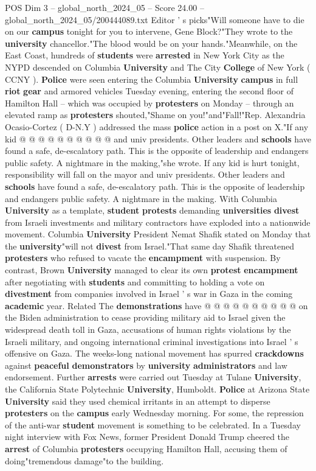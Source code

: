 \begin{textsample}{POS Dim 3 – global\_north\_2024\_05 – Score 24.00 – global\_north\_2024\_05/200444089.txt}
Editor ' s picks"Will someone have to die on our \textbf{campus} tonight for you to intervene, Gene Block?"They wrote to the \textbf{university} chancellor."The blood would be on your hands."Meanwhile, on the East Coast, hundreds of \textbf{students} were \textbf{arrested} in New York City as the NYPD descended on Columbia \textbf{University} and The City \textbf{College} of New York ( CCNY ). \textbf{Police} were seen entering the Columbia \textbf{University} \textbf{campus} in full \textbf{riot} \textbf{gear} and armored vehicles Tuesday evening, entering the second floor of Hamilton Hall -- which was occupied by \textbf{protesters} on Monday -- through an elevated ramp as \textbf{protesters} shouted,"Shame on you!"and"Fall!"Rep.
Alexandria Ocasio-Cortez ( D-N.Y ) addressed the mass \textbf{police} action in a post on X."If any kid @ @ @ @ @ @ @ @ @ @ and univ presidents.
Other leaders and \textbf{schools} have found a safe, de-escalatory path.
This is the opposite of leadership and endangers public safety.
A nightmare in the making,"she wrote.
If any kid is hurt tonight, responsibility will fall on the mayor and univ presidents.
Other leaders and \textbf{schools} have found a safe, de-escalatory path.
This is the opposite of leadership and endangers public safety.
A nightmare in the making.
With Columbia \textbf{University} as a template, \textbf{student} \textbf{protests} demanding \textbf{universities} \textbf{divest} from Israeli investments and military contractors have exploded into a nationwide movement.
Columbia \textbf{University} President Nemat Shafik stated on Monday that the \textbf{university}"will not \textbf{divest} from Israel."That same day Shafik threatened \textbf{protesters} who refused to vacate the \textbf{encampment} with suspension.
By contrast, Brown \textbf{University} managed to clear its own \textbf{protest} \textbf{encampment} after negotiating with \textbf{students} and committing to holding a vote on \textbf{divestment} from companies involved in Israel ' s war in Gaza in the coming \textbf{academic} year.
Related The \textbf{demonstrations} have @ @ @ @ @ @ @ @ @ @ on the Biden administration to cease providing military aid to Israel given the widespread death toll in Gaza, accusations of human rights violations by the Israeli military, and ongoing international criminal investigations into Israel ' s offensive on Gaza.
The weeks-long national movement has spurred \textbf{crackdowns} against \textbf{peaceful} \textbf{demonstrators} by \textbf{university} \textbf{administrators} and law endorsement.
Further \textbf{arrests} were carried out Tuesday at Tulane \textbf{University}, the California State Polytechnic \textbf{University}, Humboldt. \textbf{Police} at Arizona State \textbf{University} said they used chemical irritants in an attempt to disperse \textbf{protesters} on the \textbf{campus} early Wednesday morning.
For some, the repression of the anti-war \textbf{student} movement is something to be celebrated.
In a Tuesday night interview with Fox News, former President Donald Trump cheered the \textbf{arrest} of Columbia \textbf{protesters} occupying Hamilton Hall, accusing them of doing"tremendous damage"to the building.


\end{textsample}
